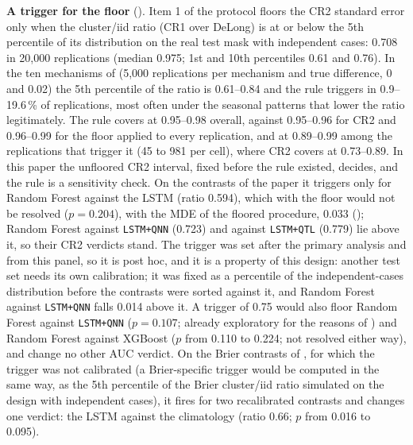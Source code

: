 \documentclass[11pt,a4paper]{article}
\begin{document}
\textbf{A trigger for the floor} (). Item 1 of the protocol floors the CR2 standard error only when the cluster/iid ratio (CR1 over DeLong) is at or below the 5th percentile of its distribution on the real test mask with independent cases: 0.708 in 20{,}000 replications (median 0.975; 1st and 10th percentiles 0.61 and 0.76). In the ten mechanisms of  (5{,}000 replications per mechanism and true difference, 0 and 0.02) the 5th percentile of the ratio is 0.61--0.84 and the rule triggers in 0.9--19.6\,\% of replications, most often under the seasonal patterns that lower the ratio legitimately. The rule covers at 0.95--0.98 overall, against 0.95--0.96 for CR2 and 0.96--0.99 for the floor applied to every replication, and at 0.89--0.99 among the replications that trigger it (45 to 981 per cell), where CR2 covers at 0.73--0.89. In this paper the unfloored CR2 interval, fixed before the rule existed, decides, and the rule is a sensitivity check. On the contrasts of the paper it triggers only for Random Forest against the LSTM (ratio 0.594), which with the floor would not be resolved ($p=0.204$), with the MDE of the floored procedure, 0.033 (); Random Forest against \texttt{LSTM+QNN} (0.723) and against \texttt{LSTM+QTL} (0.779) lie above it, so their CR2 verdicts stand. The trigger was set after the primary analysis and from this panel, so it is post hoc, and it is a property of this design: another test set needs its own calibration; it was fixed as a percentile of the independent-cases distribution before the contrasts were sorted against it, and Random Forest against \texttt{LSTM+QNN} falls 0.014 above it. A trigger of 0.75 would also floor Random Forest against \texttt{LSTM+QNN} ($p=0.107$; already exploratory for the reasons of ) and Random Forest against XGBoost ($p$ from 0.110 to 0.224; not resolved either way), and change no other AUC verdict. On the Brier contrasts of , for which the trigger was not calibrated (a Brier-specific trigger would be computed in the same way, as the 5th percentile of the Brier cluster/iid ratio simulated on the design with independent cases), it fires for two recalibrated contrasts and changes one verdict: the LSTM against the climatology (ratio 0.66; $p$ from 0.016 to 0.095).
\end{document}
